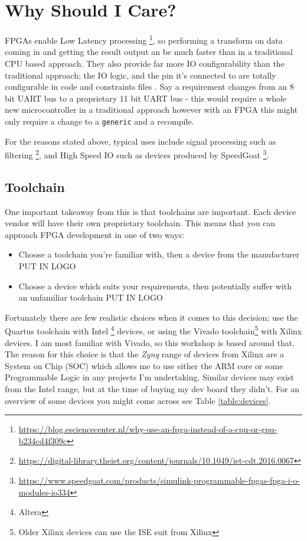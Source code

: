 \documentclass[11pt,a4paper]{article}
\newlength\myheight
\newlength\mydepth
\newcommand*\inlinegraphics[1]{%
  \settototalheight\myheight{Xygp}%
  \settodepth\mydepth{Xygp}%
  \raisebox{-\mydepth}{\texttt{[image: \#1]}}%
}
\newcommand{\handwaving}{\inlinegraphics{./src/hand.png}}
\begin{document}
\pagebreak
\tableofcontents
\listoffigures
\pagebreak

\setlength{\parskip}{\medskipamount}

\section{Why Should I Care?}
FPGAs enable Low Latency processing \footnote{\url{https://blog.esciencecenter.nl/why-use-an-fpga-instead-of-a-cpu-or-gpu-b234cd4f309c}}, so performing a transform on data coming in and getting the result output an be much faster than in a traditional CPU based approach. They also provide far more IO configurability than the traditional approach; the IO logic, and the pin it's connected to are totally configurable in code and constraints files\handwaving. Say a requirement changes from an 8 bit UART bus to a proprietary 11 bit UART bus - this would require a whole new microcontroller in a traditional approach however with an FPGA this might only require a change to a \texttt{generic} and a recompile. 

For the reasons stated above, typical uses include signal processing such as filtering \footnote{\url{https://digital-library.theiet.org/content/journals/10.1049/iet-cdt.2016.0067}}, and High Speed IO such as devices produced by SpeedGoat \footnote{\url{https://www.speedgoat.com/products/simulink-programmable-fpgas-fpga-i-o-modules-io334}}.
\subsection{Toolchain}
One important takeaway from this is that toolchains are important. Each device vendor will have their own proprietary toolchain. This means that you can approach FPGA development in one of two ways:
\begin{itemize}
    \item Choose a toolchain you're familiar with, then a device from the manufacturer PUT IN LOGO
    \item Choose a device which suits your requirements, then potentially suffer with an unfamiliar toolchain PUT IN LOGO
\end{itemize}

Fortunately there are few realistic choices when it comes to this decision; use the Quartus toolchain with Intel \footnote{Altera} devices, or using the Vivado toolchain\footnote{Older Xilinx devices can use the ISE suit from Xilinx} with Xilinx devices. I am most familiar with Vivado, so this workshop is based around that. The reason for this choice is that the \emph{Zynq} range of devices from Xilinx are a System on Chip (SOC) which allows me to use either the ARM core or some Programmable Logic in any projects I'm undertaking. Similar devices may exist from the Intel range, but at the time of buying my dev board they didn't. For an overview of some devices you might come across see Table \ref{table:devices}.
\end{document}
